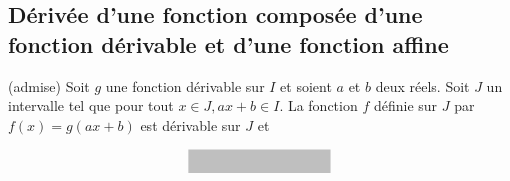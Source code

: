 \documentclass[12pt]{article}
\theoremstyle{break}
\begin{document}
\subsection{Dérivée d'une fonction composée d'une fonction dérivable et d'une fonction affine}
\begin{proposition}{(admise)} 
Soit $g$ une fonction dérivable sur $I$ et soient $a$ et $b$ deux réels. Soit $J$ un intervalle tel que pour tout $x \in J, a x+b \in I$. La fonction $f$ définie sur $J$ par $f(x)=g(a x+b)$ est dérivable sur $J$ et

$$
\hideM{f^{\prime}(x)=a \times g^{\prime}(a x+b)}
$$

\end{proposition}

\end{document}
